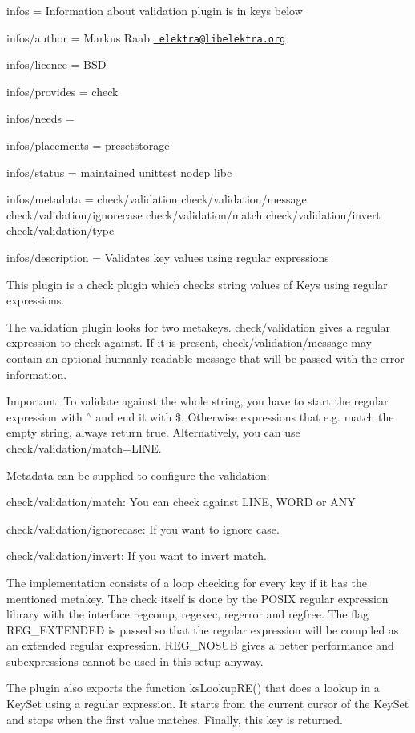 
\begin{DoxyItemize}
\item infos = Information about validation plugin is in keys below
\item infos/author = Markus Raab \href{mailto:elektra@libelektra.org}{\texttt{ elektra@libelektra.\+org}}
\item infos/licence = B\+SD
\item infos/provides = check
\item infos/needs =
\item infos/placements = presetstorage
\item infos/status = maintained unittest nodep libc
\item infos/metadata = check/validation check/validation/message check/validation/ignorecase check/validation/match check/validation/invert check/validation/type
\item infos/description = Validates key values using regular expressions
\end{DoxyItemize}

This plugin is a check plugin which checks string values of Keys using regular expressions.

The validation plugin looks for two metakeys. {\ttfamily check/validation} gives a regular expression to check against. If it is present, {\ttfamily check/validation/message} may contain an optional humanly readable message that will be passed with the error information.

Important\+: To validate against the whole string, you have to start the regular expression with {\ttfamily $^\wedge$} and end it with {\ttfamily \$}. Otherwise expressions that e.\+g. match the empty string, always return true. Alternatively, you can use {\ttfamily check/validation/match=L\+I\+NE}.

Metadata can be supplied to configure the validation\+:


\begin{DoxyItemize}
\item {\ttfamily check/validation/match}\+: You can check against {\ttfamily L\+I\+NE}, {\ttfamily W\+O\+RD} or {\ttfamily A\+NY}
\item {\ttfamily check/validation/ignorecase}\+: If you want to ignore case.
\item {\ttfamily check/validation/invert}\+: If you want to invert match.
\end{DoxyItemize}

The implementation consists of a loop checking for every key if it has the mentioned metakey. The check itself is done by the P\+O\+S\+IX regular expression library with the interface {\ttfamily regcomp}, {\ttfamily regexec}, {\ttfamily regerror} and {\ttfamily regfree}. The flag {\ttfamily R\+E\+G\+\_\+\+E\+X\+T\+E\+N\+D\+ED} is passed so that the regular expression will be compiled as an extended regular expression. {\ttfamily R\+E\+G\+\_\+\+N\+O\+S\+UB} gives a better performance and subexpressions cannot be used in this setup anyway.

The plugin also exports the function {\ttfamily ks\+Lookup\+R\+E()} that does a lookup in a Key\+Set using a regular expression. It starts from the current cursor of the Key\+Set and stops when the first value matches. Finally, this key is returned. 